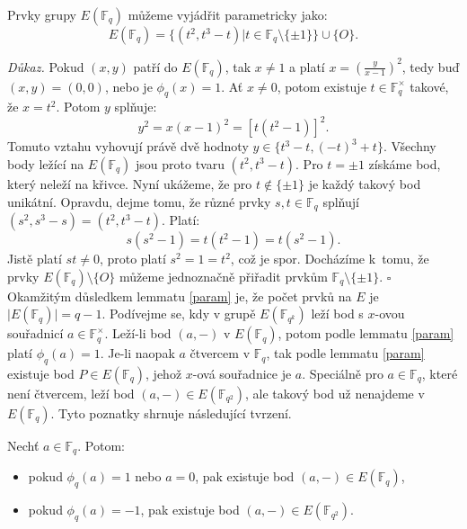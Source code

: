 \documentclass[12pt]{report}
\begin{document}
\begin{lemma}\label{param}
Prvky grupy $E(\mathbb{F}_q)$ můžeme vyjádřit parametricky jako: $$E(\mathbb{F}_q) = \lbrace (t^2,t^3-t) \vert t \in \mathbb{F}_q \setminus \lbrace \pm 1 \rbrace  \rbrace \cup \lbrace O \rbrace.$$
\end{lemma}
\noindent \textit{Důkaz.} Pokud $(x,y)$ patří do $E(\mathbb{F}_q)$, tak $x \neq 1$ a platí $x =\left( \frac{y}{x-1}\right)^2$, tedy buď $(x,y) = (0,0)$, nebo je $\phi_q (x) = 1$. Ať $x \neq 0$, potom existuje $t \in \mathbb{F}_q ^{\times}$ takové, že $x = t^2$. Potom $y$ splňuje:
$$y^2 = x (x-1)^2 = \left[t(t^2-1)\right]^2.$$
Tomuto vztahu vyhovují právě dvě hodnoty $y \in \lbrace t^3-t, (-t)^3+t \rbrace$. Všechny body ležící na $E(\mathbb{F}_q)$ jsou proto tvaru $(t^2,t^3-t)$. Pro $t = \pm 1$ získáme bod, který neleží na křivce. Nyní ukážeme, že pro $t \not\in \lbrace \pm 1 \rbrace$ je každý takový bod unikátní. Opravdu, dejme tomu, že různé prvky $s,t \in \mathbb{F}_q$ splňují $(s^2,s^3-s) = (t^2,t^3-t)$. Platí:
$$s(s^2-1) = t(t^2-1) = t(s^2-1).$$
Jistě platí $st \neq 0$, proto platí $s^2=1=t^2$, což je spor. Docházíme k~tomu, že prvky $E(\mathbb{F}_q) \setminus \lbrace O \rbrace$ můžeme jednoznačně přiřadit prvkům $\mathbb{F}_q \setminus \lbrace \pm 1 \rbrace$. \hfill $\square$\\

Okamžitým důsledkem lemmatu \ref{param} je, že počet prvků na $E$ je $\vert E(\mathbb{F}_q)\vert = q-1$. 
Podívejme se, kdy v grupě $E(\mathbb{F}_{q^k})$ leží bod s $x$-ovou souřadnicí $a \in \mathbb{F}_q ^{\times}$. Leží-li bod $(a,-)$ v $E(\mathbb{F}_q)$, potom podle lemmatu \ref{param} platí $\phi_q(a)=1$. Je-li naopak $a$ čtvercem v $\mathbb{F}_q$, tak podle lemmatu \ref{param} existuje bod $P \in E(\mathbb{F}_q)$, jehož $x$-ová souřadnice je $a$. Speciálně pro $a \in \mathbb{F}_q$, které není čtvercem, leží bod $(a,-) \in E(\mathbb{F}_{q^2})$, ale takový bod už nenajdeme v $E(\mathbb{F}_q)$. Tyto poznatky shrnuje následující tvrzení.

\begin{veta}\label{Fq2}
Nechť $a \in \mathbb{F}_q$. Potom:
\begin{itemize}
\item pokud $\phi_q(a) = 1$ nebo $a=0$, pak existuje bod $(a,-) \in E(\mathbb{F}_q)$,
\item pokud $\phi_q(a) = -1$, pak existuje bod $(a,-) \in E(\mathbb{F}_{q^2})$.
\end{itemize}
\end{veta}
\end{document}
